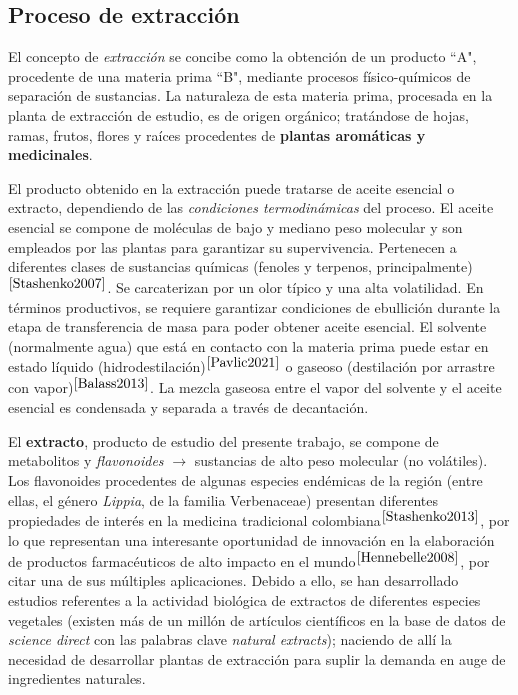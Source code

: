 \subsection{Proceso de extracci\'on}

\noindent
\justify

El concepto de \textit{extracci\'on} se concibe como la obtenci\'on de un producto ``A", procedente de una materia prima ``B", mediante procesos f\'isico-qu\'imicos de separaci\'on de sustancias. La naturaleza de esta materia prima, procesada en la planta de extracci\'on de estudio, es de origen org\'anico; trat\'andose de hojas, ramas, frutos, flores y ra\'ices procedentes de \textbf{plantas arom\'aticas y medicinales}.



\newpage

\noindent
\justify

El producto obtenido en la extracci\'on puede tratarse de aceite esencial o extracto, dependiendo de las \textit{condiciones termodin\'amicas} del proceso. El aceite esencial se compone de mol\'eculas de bajo y mediano peso molecular y son empleados por las plantas para garantizar su supervivencia. Pertenecen a diferentes clases de sustancias qu\'imicas (fenoles y terpenos, principalmente)$^{\cite{Stashenko2007}}$. Se carcaterizan por un olor t\'ipico y una alta volatilidad. En t\'erminos productivos, se requiere garantizar condiciones de ebullici\'on durante la etapa de transferencia de masa para poder obtener aceite esencial. El solvente (normalmente agua) que est\'a en contacto con la materia prima puede estar en estado l\'iquido (hidrodestilaci\'on)$^{\cite{Pavlic2021}}$ o gaseoso (destilaci\'on por arrastre con vapor)$^{\cite{Balass2013}}$. La mezcla gaseosa entre el vapor del solvente y el aceite esencial es condensada y separada a trav\'es de decantaci\'on.

\noindent
\justify

El \textbf{extracto}, producto de estudio del presente trabajo, se compone de metabolitos y \textit{flavonoides} $\rightarrow$ sustancias de alto peso molecular (no vol\'atiles). Los flavonoides procedentes de algunas especies end\'emicas de la regi\'on (entre ellas, el g\'enero \textit{Lippia}, de la familia Verbenaceae) presentan diferentes propiedades de inter\'es en la medicina tradicional colombiana$^{\cite{Stashenko2013}}$, por lo que representan una interesante oportunidad de innovaci\'on en la elaboraci\'on de productos farmac\'euticos de alto impacto en el mundo$^{\cite{Hennebelle2008}}$, por citar una de sus m\'ultiples aplicaciones. Debido a ello, se han desarrollado estudios referentes a la actividad biol\'ogica de extractos de diferentes especies vegetales (existen m\'as de un mill\'on de art\'iculos cient\'ificos en la base de datos de \textit{science direct} con las palabras clave \textit{natural extracts}); naciendo de all\'i la necesidad de desarrollar plantas de extracci\'on para suplir la demanda en auge de ingredientes naturales. 

